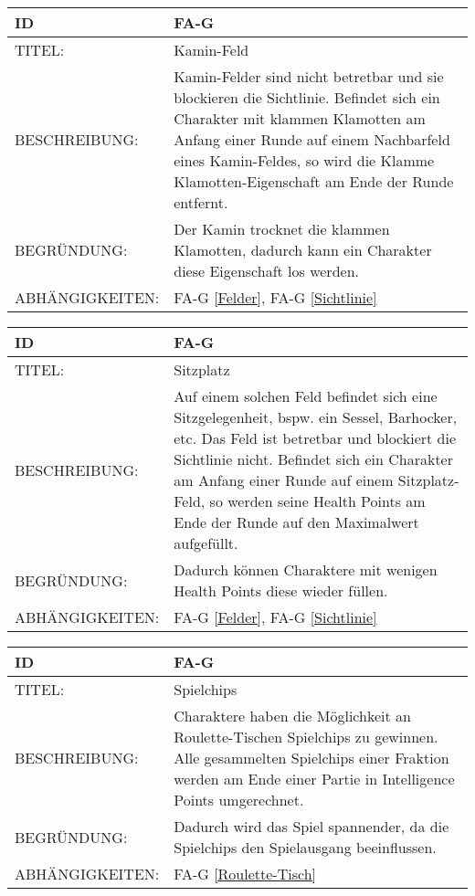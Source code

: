 \begin{tabularx}{16cm}{l|X}
	{table}\label{Kamin-Feld}
	\textbf{ID} & \textbf{FA-G \arabic{table}} \\
	\hline
	TITEL: & Kamin-Feld \\
	\hline
	BESCHREIBUNG: & Kamin-Felder sind nicht betretbar und sie blockieren die Sichtlinie. Befindet sich ein Charakter mit klammen Klamotten am Anfang einer Runde auf einem Nachbarfeld eines Kamin-Feldes, so wird die Klamme Klamotten-Eigenschaft am Ende der Runde entfernt. \\
	\hline
	BEGRÜNDUNG: & Der Kamin trocknet die klammen Klamotten, dadurch kann ein Charakter diese Eigenschaft los werden. \\
	\hline
	ABHÄNGIGKEITEN: & FA-G \ref{Felder}, FA-G \ref{Sichtlinie} \\
\end{tabularx}

\begin{tabularx}{16cm}{l|X}
	{table}\label{Sitzplatz}
	\textbf{ID} & \textbf{FA-G \arabic{table}} \\
	\hline
	TITEL: & Sitzplatz \\
	\hline
	BESCHREIBUNG: & Auf einem solchen Feld befindet sich eine Sitzgelegenheit, bspw. ein Sessel, Barhocker, etc. Das Feld ist betretbar und blockiert die Sichtlinie nicht. Befindet sich ein Charakter am Anfang einer Runde auf einem Sitzplatz-Feld, so werden seine Health Points am Ende der Runde auf den Maximalwert aufgefüllt. \\
	\hline
	BEGRÜNDUNG: & Dadurch können Charaktere mit wenigen Health Points diese wieder füllen. \\
	\hline
	ABHÄNGIGKEITEN: & FA-G \ref{Felder}, FA-G \ref{Sichtlinie} \\
\end{tabularx}

\begin{tabularx}{16cm}{l|X}
	{table}\label{Spielchips}
	\textbf{ID} & \textbf{FA-G \arabic{table}} \\
	\hline
	TITEL: & Spielchips \\
	\hline
	BESCHREIBUNG: & Charaktere haben die Möglichkeit an Roulette-Tischen Spielchips zu gewinnen. Alle gesammelten Spielchips einer Fraktion werden am Ende einer Partie in Intelligence Points umgerechnet. \\
	\hline
	BEGRÜNDUNG: & Dadurch wird das Spiel spannender, da die Spielchips den Spielausgang beeinflussen. \\
	\hline
	ABHÄNGIGKEITEN: & FA-G \ref{Roulette-Tisch} \\
\end{tabularx}


